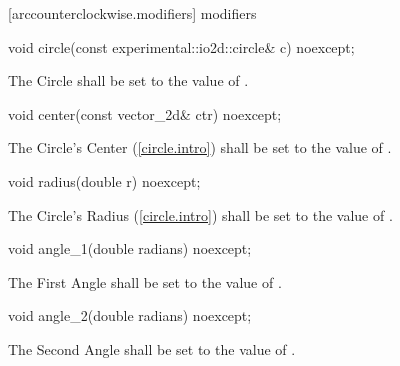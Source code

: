  [arccounterclockwise.modifiers]{ modifiers}

\begin{itemdecl}
void circle(const experimental::io2d::circle& c) noexcept;
\end{itemdecl}
\begin{itemdescr}
\pnum
\effects
The Circle shall be set to the value of .
\end{itemdescr}

\begin{itemdecl}
void center(const vector_2d& ctr) noexcept;
\end{itemdecl}
\begin{itemdescr}
\pnum
\effects
The Circle's Center (\ref{circle.intro}) shall be set to the value of .
\end{itemdescr}

\begin{itemdecl}
void radius(double r) noexcept;
\end{itemdecl}
\begin{itemdescr}
\pnum
\effects
The Circle's Radius (\ref{circle.intro}) shall be set to the value of .
\end{itemdescr}

\begin{itemdecl}
void angle_1(double radians) noexcept;
\end{itemdecl}
\begin{itemdescr}
\pnum
\effects
The First Angle shall be set to the value of .
\end{itemdescr}

\begin{itemdecl}
void angle_2(double radians) noexcept;
\end{itemdecl}
\begin{itemdescr}
\pnum
\effects
The Second Angle shall be set to the value of .
\end{itemdescr}

